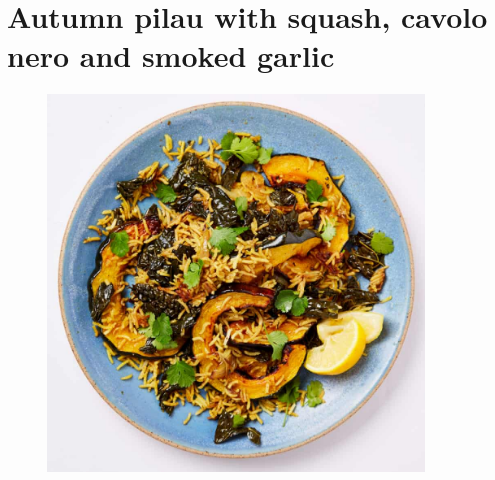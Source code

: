 \documentclass{book}
\begin{document}
\section{Autumn pilau with squash, cavolo nero and smoked garlic }
\begin{figure}
\centering\includegraphics[width=10cm,height=10cm,keepaspectratio]{Recipe_Pictures/Autumn_pilau_with_squash,_cavolo_nero_and_smoked_garlic_.png}
\end{figure}
\end{document}
